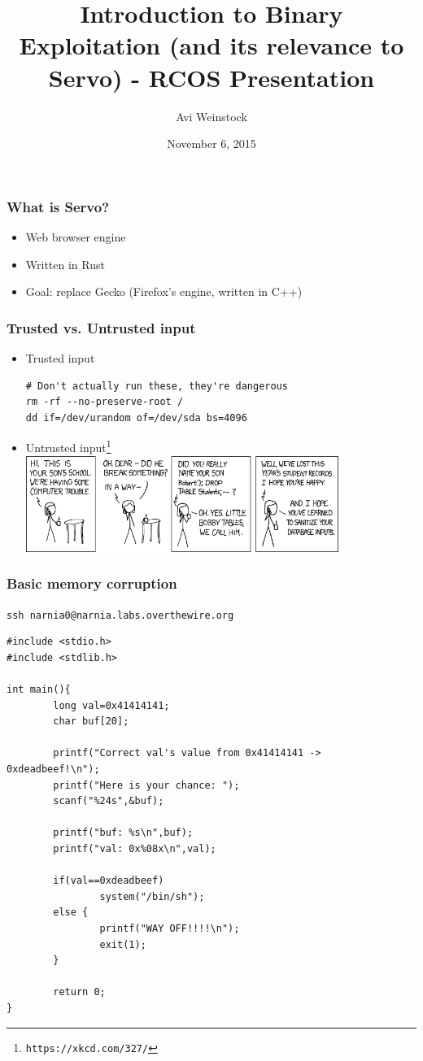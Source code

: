 \documentclass{beamer}
\title{Introduction to Binary Exploitation (and its relevance to Servo) - RCOS Presentation}
\date{November 6, 2015}
\author{Avi Weinstock}
\begin{document}
\maketitle

\begin{frame}[fragile]
\frametitle{What is Servo?}
\begin{itemize}
\item
Web browser engine
\item
Written in Rust
\item
Goal: replace Gecko (Firefox's engine, written in C++)
\end{itemize}
\end{frame}

\begin{frame}[fragile]
\frametitle{Trusted vs. Untrusted input}
\begin{itemize}
\item
Trusted input
\begin{Verbatim}[frame=single]
# Don't actually run these, they're dangerous
rm -rf --no-preserve-root /
dd if=/dev/urandom of=/dev/sda bs=4096
\end{Verbatim}
\item
Untrusted input\footnote{\Verb|https://xkcd.com/327/|}
\includegraphics[width=0.8\textwidth]{xkcd_sqli.png}
\end{itemize}
\end{frame}

\begin{frame}[fragile]
\frametitle{Basic memory corruption}
\verb|ssh narnia0@narnia.labs.overthewire.org|\\
\begin{Verbatim}[frame=single, fontsize=\scriptsize]
#include <stdio.h>
#include <stdlib.h>

int main(){
        long val=0x41414141;
        char buf[20];

        printf("Correct val's value from 0x41414141 -> 0xdeadbeef!\n");
        printf("Here is your chance: ");
        scanf("%24s",&buf);

        printf("buf: %s\n",buf);
        printf("val: 0x%08x\n",val);

        if(val==0xdeadbeef)
                system("/bin/sh");
        else {
                printf("WAY OFF!!!!\n");
                exit(1);
        }

        return 0;
}
\end{Verbatim}
\end{frame}
\end{document}

